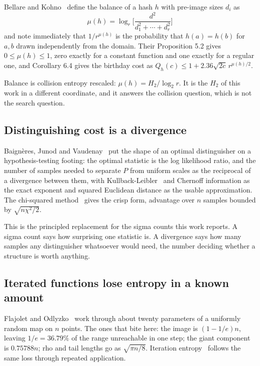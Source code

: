 Bellare and Kohno~\cite{src:Bellare-and-Kohno-2004} define the balance of a hash \(h\) with pre-image sizes \(d_i\) as
\[
\mu(h) = \log_r\Big[\frac{d^2}{d_1^2 + \cdots + d_r^2}\Big]
\]
and note immediately that \(1/r^{\mu(h)}\) is the probability that \(h(a) = h(b)\) for \(a, b\) drawn independently from the domain. Their Proposition 5.2 gives \(0 \le \mu(h) \le 1\), zero exactly for a constant function and one exactly for a regular one, and Corollary 6.4 gives the birthday cost as \(Q_h(c) \le 1 + 2.36\sqrt{2c}\, r^{\mu(h)/2}\).

Balance is collision entropy rescaled: \(\mu(h) = H_2 / \log_2 r\). It is the \(H_2\) of this work in a different coordinate, and it answers the collision question, which is not the search question.

\subsection{Distinguishing cost is a divergence}

Baignères, Junod and Vaudenay~\cite{src:Baigneres-Junod-and-Vaudenay-2004,src:Baigneres-and-Vaudenay-2008} put the shape of an optimal distinguisher on a hypothesis-testing footing: the optimal statistic is the log likelihood ratio, and the number of samples needed to separate \(P\) from uniform scales as the reciprocal of a divergence between them, with Kullback-Leibler~\cite{src:Kullback} and Chernoff information as the exact exponent and squared Euclidean distance as the usable approximation. The chi-squared method~\cite{src:Dai-Hoang-and-Tessaro-2017} gives the crisp form, advantage over \(n\) samples bounded by \(\sqrt{n\chi^2/2}\).

This is the principled replacement for the sigma counts this work reports. A sigma count says how surprising one statistic is. A divergence says how many samples any distinguisher whatsoever would need, the number deciding whether a structure is worth anything.

\subsection{Iterated functions lose entropy in a known amount}

Flajolet and Odlyzko~\cite{src:Flajolet-and-Odlyzko-1989} work through about twenty parameters of a uniformly random map on \(n\) points. The ones that bite here: the image is \((1 - 1/e)n\), leaving \(1/e = 36.79\%\) of the range unreachable in one step; the giant component is \(0.75788n\); rho and tail lengths go as \(\sqrt{\pi n / 8}\). Iteration entropy~\cite{src:arXiv-1712-01407} follows the same loss through repeated application.

